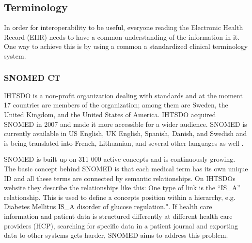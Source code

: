 \documentclass[14pt]{article}
\begin{document}




\subsection{Terminology}
\label{sec:TechnicalStandardsTerminology}
In order for interoperability to be useful, everyone reading the Electronic Health Record (EHR) needs to have a common understanding of the information in it. One way to achieve this is by using a common a standardized clinical terminology system.

\subsubsection{SNOMED CT}

\gls{IHTSDO} is a non-profit organization dealing with standards and at the moment 17 countries are members of the organization; among them are Sweden, the United Kingdom, and the United States of America. \gls{IHTSDO} acquired \gls{SNOMED} in 2007 and made it more accessible for a wider audience. \gls{SNOMED} is currently available in US English, UK English, Spanish, Danish, and Swedish and is being translated into French, Lithuanian, and several other languages as well \cite{ihtsdolang}.

\gls{SNOMED} is built up on 311 000 active concepts and is continuously growing. The basic concept behind \gls{SNOMED} is that each medical term has its own unique ID and all these terms are connected by semantic relationships. On \gls{IHTSDO}s website they describe the relationships like this: One type of link is the “IS\_A” relationship. This is used to define a concepts position within a hierarchy, e.g. Diabetes Mellitus IS\_A disorder of glucose regulation."\cite{ihtsdocomp}. If health care information and patient data is structured differently at different health care providers (HCP), searching for specific data in a patient journal and exporting data to other systems gets harder, \gls{SNOMED} aims to address this problem.
\end{document}
